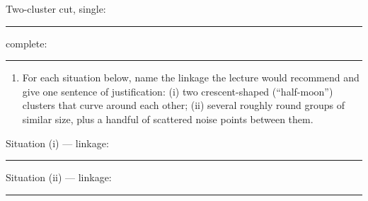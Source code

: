 \documentclass[
  11pt,
]{article}
\providecommand{\tightlist}{%
  \setlength{\itemsep}{0pt}\setlength{\parskip}{0pt}}
\newcommand{\answerspace}[1]{\par\vspace*{#1}}  %
\newcommand{\blank}[1][1.2in]{\rule{#1}{0.4pt}}
\begin{document}
\answerspace{3.4in}

Two-cluster cut, single: \blank[2in] \qquad complete: \blank[2in]

\answerspace{1.4in}

\begin{enumerate}
\def\labelenumi{(\alph{enumi})}
\setcounter{enumi}{3}
\tightlist
\item
  For each situation below, name the linkage the lecture would recommend
  and give one sentence of justification: (i) two crescent-shaped
  (``half-moon'') clusters that curve around each other; (ii) several
  roughly round groups of similar size, plus a handful of scattered
  noise points between them.
\end{enumerate}

Situation (i) --- linkage: \blank[1.5in]

\answerspace{1in}

Situation (ii) --- linkage: \blank[1.5in]

\answerspace{1in}
\end{document}
